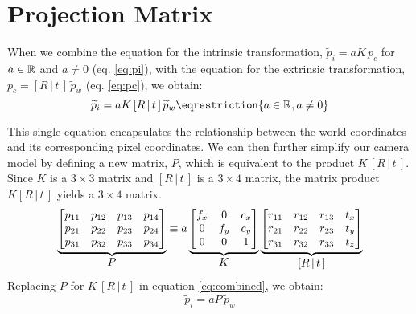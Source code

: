 \section{Projection Matrix} \label{sec:projection}

When we combine the equation for the intrinsic transformation, $\widetilde{p}_i = aK\,p_c$ for $a \in \mathbb{R}$ and $a \neq 0$ (eq. \ref{eq:pi}), with the equation for the extrinsic transformation, $p_c = [R\,|\,t\,]\,\widetilde{p}_w$ (eq. \ref{eq:pc}), we obtain:
\begin{equation} \label{eq:combined}
    \widetilde{p}_{i} = aK\,[R\,|\,t\,]\,\widetilde{p}_{w} \eqrestriction{a \in \Real, a \neq 0}
\end{equation}

This single equation encapsulates the relationship between the world coordinates and its corresponding pixel coordinates. We can then further simplify our camera model by defining a new matrix, $P$, which is equivalent to the product $K\,[R\,|\,t\,]$. Since $K$ is a $3 \times 3$ matrix and $[R\,|\,t\,]$ is a $3 \times 4$ matrix, the matrix product $K[R\,|\,t\,]$ yields a $3 \times 4$ matrix. 
\begin{equation}
    \underbrace{
        \begin{bmatrix}
        p_{11} & p_{12} & p_{13} & p_{14} \\
        p_{21} & p_{22} & p_{23} & p_{24} \\
        p_{31} & p_{32} & p_{33} & p_{34}
    \end{bmatrix}
    }_{\mathlarger{P}}
    \equiv
    a
    \underbrace{
        \begin{bmatrix}
            f_x & 0   & c_x \\
            0   & f_y & c_y \\
            0   & 0   & 1
        \end{bmatrix}
    }_{\mathlarger{K}}
    \underbrace{
        \begin{bmatrix}
            r_{11} & r_{12} & r_{13} & t_x \\
            r_{21} & r_{22} & r_{23} & t_y \\
            r_{31} & r_{32} & r_{33} & t_z \\
        \end{bmatrix}
    }_{\mathlarger{[R\,|\,t\,]}}
\end{equation}
Replacing $P$ for $K\,[R\,|\,t\,]$ in equation \ref{eq:combined}, we obtain:
\begin{equation} \label{eq:project}
    \widetilde{p}_{i} = aP\,\widetilde{p}_{w}
\end{equation}
